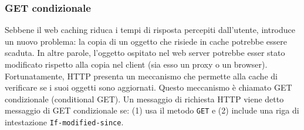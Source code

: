 \subsubsection{GET condizionale}
Sebbene il web caching riduca i tempi di risposta percepiti dall'utente, introduce un nuovo problema: la copia di un oggetto che risiede in cache potrebbe essere scaduta. In altre parole, l'oggetto ospitato nel web server potrebbe esser stato modificato rispetto alla copia nel client (sia esso un proxy o un browser). Fortunatamente, HTTP presenta un meccanismo che permette alla cache di verificare se i suoi oggetti sono aggiornati. Questo meccanismo è chiamato GET condizionale (conditional GET).
Un messaggio di richiesta HTTP viene detto messaggio di GET condizionale se: (1) usa il metodo \verb|GET| e (2) include una riga di intestazione \verb|If-modified-since|.

